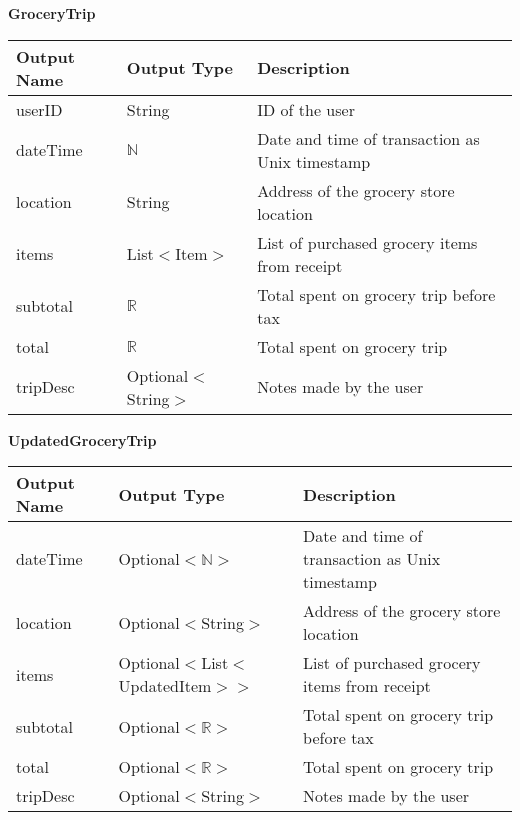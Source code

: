 \documentclass[12pt, titlepage]{article}
\begin{document}
\textbf{GroceryTrip}

\begin{table}[H]
  \begin{tabular}{|p{}|p{}|p{}|}
    \hline
    \textbf{Output Name} & \textbf{Output Type} & \textbf{Description} \\
    \hline
    userID & String & ID of the user \\
    \hline
    dateTime & $\mathbb{N}$ & Date and time of transaction as Unix timestamp \\
    \hline
    location & String & Address of the grocery store location \\
    \hline
    items & List$<$Item$>$ & List of purchased grocery items from receipt \\
    \hline
    subtotal & $\mathbb{R}$ & Total spent on grocery trip before tax \\
    \hline
    total & $\mathbb{R}$ & Total spent on grocery trip \\
    \hline
    tripDesc & Optional$<$String$>$ & Notes made by the user \\
    \hline
  \end{tabular}
\end{table}

\textbf{UpdatedGroceryTrip}

\begin{table}[H]
  \begin{tabular}{|p{}|p{}|p{}|}
    \hline
    \textbf{Output Name} & \textbf{Output Type} & \textbf{Description} \\
    \hline
    dateTime & Optional$<\mathbb{N}>$ & Date and time of transaction as Unix timestamp \\
    \hline
    location & Optional$<$String$>$ & Address of the grocery store location \\
    \hline
    items & Optional$<$List$<$UpdatedItem$>$$>$ & List of purchased grocery items from receipt \\
    \hline
    subtotal & Optional$<\mathbb{R}>$ & Total spent on grocery trip before tax \\
    \hline
    total & Optional$<\mathbb{R}>$ & Total spent on grocery trip \\
    \hline
    tripDesc & Optional$<$String$>$ & Notes made by the user \\
    \hline
  \end{tabular}
\end{table}
\end{document}
